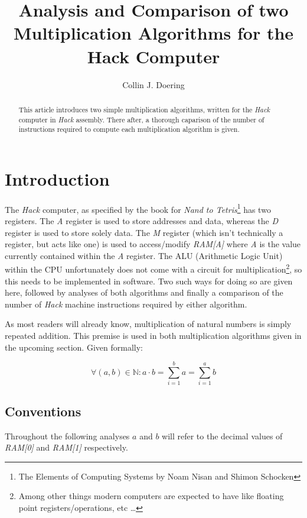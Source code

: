 \documentclass[a4paper,10pt,fleqn]{article}
\title{Analysis and Comparison of two Multiplication Algorithms for the Hack Computer}
\author{Collin J. Doering}
\begin{document}
\maketitle

\begin{abstract}
  This article introduces two simple multiplication algorithms, written for the \emph{Hack}
  computer in \emph{Hack} assembly. There after, a thorough caparison of the number of
  instructions required to compute each multiplication algorithm is given.
\end{abstract}

\tableofcontents
\clearpage

\section{Introduction}

The \emph{Hack} computer, as specified by the book for \emph{Nand to
  Tetris}\footnote{\label{nandtotetrisbook}The Elements of Computing Systems by Noam Nisan and
  Shimon Schocken} has two registers. The \emph{A} register is used to store addresses and
data, whereas the \emph{D} register is used to store solely data. The \emph{M} register (which
isn't technically a register, but acts like one) is used to access/modify \emph{RAM[A]} where
\emph{A} is the value currently contained within the \emph{A} register. The ALU (Arithmetic
Logic Unit) within the CPU unfortunately does not come with a circuit for
multiplication\footnote{Among other things modern computers are expected to have like floating
  point registers/operations, etc \ldots}, so this needs to be implemented in software. Two
such ways for doing so are given here, followed by analyses of both algorithms and finally a
comparison of the number of \emph{Hack} machine instructions required by either algorithm.

As most readers will already know, multiplication of natural numbers is simply repeated
addition. This premise is used in both multiplication algorithms given in the upcoming section.
Given formally:

\begin{equation*}
\forall (a,b) \in \mathbb{N} : a \cdot b = \sum_{i=1}^{b} a = \sum_{i=1}^{a} b
\end{equation*}

\subsection{Conventions}
Throughout the following analyses $a$ and $b$ will refer to the decimal values of \emph{RAM[0]}
and \emph{RAM[1]} respectively.
\end{document}
